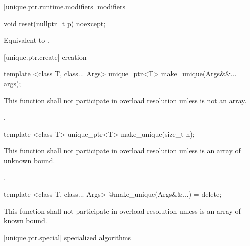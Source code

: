 [unique.ptr.runtime.modifiers]{ modifiers}

\begin{itemdecl}
void reset(nullptr_t p) noexcept;
\end{itemdecl}

\begin{itemdescr}
\pnum
\effects Equivalent to .
\end{itemdescr}

[unique.ptr.create]{ creation}

\begin{itemdecl}
template <class T, class... Args> unique_ptr<T> make_unique(Args&&... args);
\end{itemdecl}

\begin{itemdescr}
\pnum
\remarks This function shall not participate in overload resolution unless  is not an array.

\pnum
\returns {}.

\end{itemdescr}

\begin{itemdecl}
template <class T> unique_ptr<T> make_unique(size_t n);
\end{itemdecl}

\begin{itemdescr}
\pnum
\remarks This function shall not participate in overload resolution unless  is an array of unknown bound.

\pnum
\returns {}.

\end{itemdescr}

\begin{itemdecl}
template <class T, class... Args> @\unspec@ make_unique(Args&&...) = delete;
\end{itemdecl}

\begin{itemdescr}
\pnum
\remarks This function shall not participate in overload resolution unless  is an array of known bound.

\end{itemdescr}

[unique.ptr.special]{ specialized algorithms}

